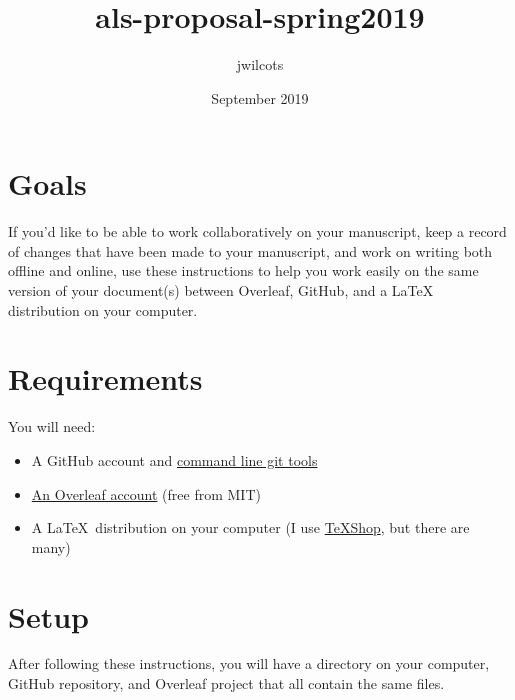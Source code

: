 \documentclass[10pt]{article}
\title{als-proposal-spring2019}
\author{jwilcots }
\date{September 2019}
\begin{document}
\section{Goals}
If you'd like to be able to work collaboratively on your manuscript, keep a record of changes that have been made to your manuscript, and work on writing both offline and online, use these instructions to help you work easily on the same version of your document(s) between Overleaf, GitHub, and a \LaTeX~ distribution on your computer.

\section{Requirements}
You will need:
\begin{itemize}
\item A GitHub account and \href{https://git-scm.com/book/en/v2/Getting-Started-Installing-Git}{command line git tools}
\item \href{https://www.overleaf.com/edu/mit}{An Overleaf account} (free from MIT)
\item A \LaTeX~distribution on your computer (I use \href{https://pages.uoregon.edu/koch/texshop/}{TeXShop}, but there are many)
\end{itemize}

\section{Setup}
After following these instructions, you will have a directory on your computer, GitHub repository, and Overleaf project that all contain the same files.
\end{document}
